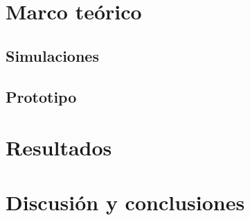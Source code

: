 \documentclass[a4paper,11pt]{article}
\begin{document}
\pagestyle{plain}

\thispagestyle{empty}


\newpage
\thispagestyle{empty}
\mbox{}

\newpage


\newpage
\thispagestyle{empty}
\tableofcontents

\newpage
\thispagestyle{empty}
\listoffigures

\newpage
\thispagestyle{empty}
\listoftables


\newpage


\newpage


\newpage
\section{Marco teórico}

\newpage



\newpage
\subsection{Simulaciones}

\newpage
\subsection{Prototipo}

\newpage
\section{Resultados}

\newpage
\section{Discusión y conclusiones}

\newpage


\end{document}
